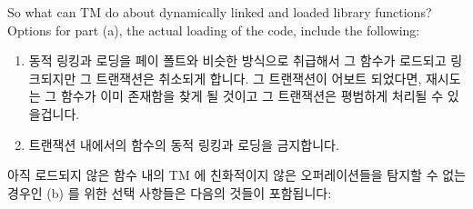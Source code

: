 So what can TM do about dynamically linked and loaded library functions?
Options for part (a), the actual loading of the code, include the following:

\fi

\begin{enumerate}
\item	동적 링킹과 로딩을 페이 폴트와 비슷한 방식으로 취급해서 그 함수가
	로드되고 링크되지만 그 트랜잭션은 취소되게 합니다.
	그 트랜잭션이 어보트 되었다면, 재시도는 그 함수가 이미 존재함을 찾게 될
	것이고 그 트랜잭션은 평범하게 처리될 수 있을겁니다.
\item	트랜잭션 내에서의 함수의 동적 링킹과 로딩을 금지합니다.

\end{enumerate}

아직 로드되지 않은 함수 내의 TM 에 친화적이지 않은 오퍼레이션들을 탐지할 수
없는 경우인 (b) 를 위한 선택 사항들은 다음의 것들이 포함됩니다:

